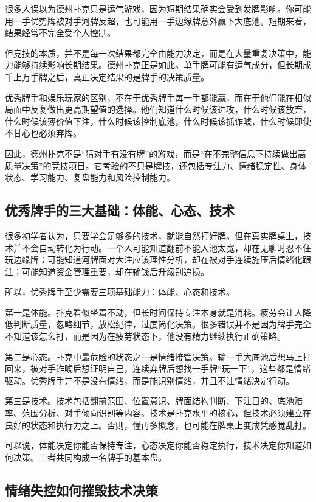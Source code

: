 很多人误以为德州扑克只是运气游戏，因为短期结果确实会受到发牌影响。你可能用一手优势牌被对手河牌反超，也可能用一手边缘牌意外赢下大底池。短期来看，结果经常不完全受个人控制。

但竞技的本质，并不是每一次结果都完全由能力决定，而是在大量重复决策中，能力能够持续影响长期结果。德州扑克正是如此。单手牌可能有运气成分，但长期成千上万手牌之后，真正决定结果的是牌手的决策质量。

优秀牌手和娱乐玩家的区别，不在于优秀牌手每一手都能赢，而在于他们能在相似局面中反复做出更高期望值的选择。他们知道什么时候该进攻，什么时候该放弃，什么时候该薄价值下注，什么时候该控制底池，什么时候该抓诈唬，什么时候即使不甘心也必须弃牌。

因此，德州扑克不是“猜对手有没有牌”的游戏，而是“在不完整信息下持续做出高质量决策”的竞技项目。它考验的不只是牌技，还包括专注力、情绪稳定性、身体状态、学习能力、复盘能力和风险控制能力。

\subsection{优秀牌手的三大基础：体能、心态、技术}

很多初学者认为，只要学会足够多的技术，就能自然打好牌。但在真实牌桌上，技术并不会自动转化为行动。一个人可能知道翻前不能入池太宽，却在无聊时忍不住玩边缘牌；可能知道河牌面对大注应该理性分析，却在被对手连续施压后情绪化跟注；可能知道资金管理重要，却在输钱后升级别追损。

所以，优秀牌手至少需要三项基础能力：体能、心态和技术。

第一是体能。扑克看似坐着不动，但长时间保持专注本身就是消耗。疲劳会让人降低判断质量，忽略细节，放松纪律，过度简化决策。很多错误并不是因为牌手完全不知道该怎么打，而是因为在疲劳状态下，他没有精力继续执行正确策略。

第二是心态。扑克中最危险的状态之一是情绪接管决策。输一手大底池后想马上打回来，被对手诈唬后想证明自己，连续弃牌后想找一手牌“玩一下”，这些都是情绪驱动。优秀牌手并不是没有情绪，而是能识别情绪，并且不让情绪决定行动。

第三是技术。技术包括翻前范围、位置意识、牌面结构判断、下注目的、底池赔率、范围分析、对手倾向识别等内容。技术是扑克水平的核心，但技术必须建立在良好的状态和执行力之上。否则，懂再多概念，也可能在牌桌上变成凭感觉乱打。

可以说，体能决定你能否保持专注，心态决定你能否稳定执行，技术决定你知道如何决策。三者共同构成一名牌手的基本盘。

\subsection{情绪失控如何摧毁技术决策}

